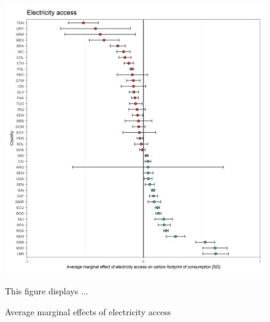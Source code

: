 \documentclass[12pt, a4paper]{article}
\newenvironment{subcaption}
{\strut
\vspace{-5pt}
\begin{minipage}[b]{0.9\textwidth}
  \hspace*{-\parindent}
  \footnotesize}
 {\end{minipage}}
\begin{document}
\begin{figure}[ht!]
  \centering
 \caption{Average marginal effects of electricity access} \label{fig:D2_Electricity}
  \includegraphics{Analysis_OLS_ME_Carbon_Footprint/AME_OLS_FP_electricity.access}
  \begin{subcaption}
    This figure displays ...
  \end{subcaption}

\end{figure}

\clearpage
\end{document}
